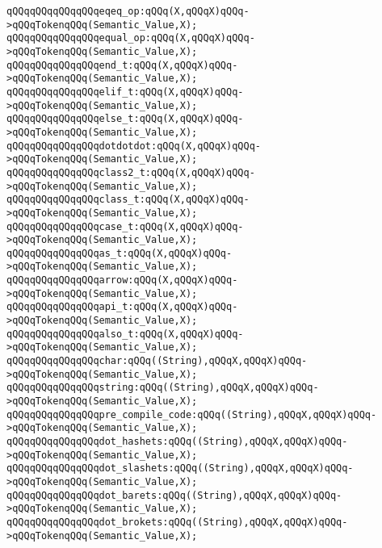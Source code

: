 \verb|qQQqqQQqqQQqqQQqeqeq_op:qQQq(X,qQQqX)qQQq->qQQqTokenqQQq(Semantic_Value,X);|\newline
\verb|qQQqqQQqqQQqqQQqequal_op:qQQq(X,qQQqX)qQQq->qQQqTokenqQQq(Semantic_Value,X);|\newline
\verb|qQQqqQQqqQQqqQQqend_t:qQQq(X,qQQqX)qQQq->qQQqTokenqQQq(Semantic_Value,X);|\newline
\verb|qQQqqQQqqQQqqQQqelif_t:qQQq(X,qQQqX)qQQq->qQQqTokenqQQq(Semantic_Value,X);|\newline
\verb|qQQqqQQqqQQqqQQqelse_t:qQQq(X,qQQqX)qQQq->qQQqTokenqQQq(Semantic_Value,X);|\newline
\verb|qQQqqQQqqQQqqQQqdotdotdot:qQQq(X,qQQqX)qQQq->qQQqTokenqQQq(Semantic_Value,X);|\newline
\verb|qQQqqQQqqQQqqQQqclass2_t:qQQq(X,qQQqX)qQQq->qQQqTokenqQQq(Semantic_Value,X);|\newline
\verb|qQQqqQQqqQQqqQQqclass_t:qQQq(X,qQQqX)qQQq->qQQqTokenqQQq(Semantic_Value,X);|\newline
\verb|qQQqqQQqqQQqqQQqcase_t:qQQq(X,qQQqX)qQQq->qQQqTokenqQQq(Semantic_Value,X);|\newline
\verb|qQQqqQQqqQQqqQQqas_t:qQQq(X,qQQqX)qQQq->qQQqTokenqQQq(Semantic_Value,X);|\newline
\verb|qQQqqQQqqQQqqQQqarrow:qQQq(X,qQQqX)qQQq->qQQqTokenqQQq(Semantic_Value,X);|\newline
\verb|qQQqqQQqqQQqqQQqapi_t:qQQq(X,qQQqX)qQQq->qQQqTokenqQQq(Semantic_Value,X);|\newline
\verb|qQQqqQQqqQQqqQQqalso_t:qQQq(X,qQQqX)qQQq->qQQqTokenqQQq(Semantic_Value,X);|\newline
\verb|qQQqqQQqqQQqqQQqchar:qQQq((String),qQQqX,qQQqX)qQQq->qQQqTokenqQQq(Semantic_Value,X);|\newline
\verb|qQQqqQQqqQQqqQQqstring:qQQq((String),qQQqX,qQQqX)qQQq->qQQqTokenqQQq(Semantic_Value,X);|\newline
\verb|qQQqqQQqqQQqqQQqpre_compile_code:qQQq((String),qQQqX,qQQqX)qQQq->qQQqTokenqQQq(Semantic_Value,X);|\newline
\verb|qQQqqQQqqQQqqQQqdot_hashets:qQQq((String),qQQqX,qQQqX)qQQq->qQQqTokenqQQq(Semantic_Value,X);|\newline
\verb|qQQqqQQqqQQqqQQqdot_slashets:qQQq((String),qQQqX,qQQqX)qQQq->qQQqTokenqQQq(Semantic_Value,X);|\newline
\verb|qQQqqQQqqQQqqQQqdot_barets:qQQq((String),qQQqX,qQQqX)qQQq->qQQqTokenqQQq(Semantic_Value,X);|\newline
\verb|qQQqqQQqqQQqqQQqdot_brokets:qQQq((String),qQQqX,qQQqX)qQQq->qQQqTokenqQQq(Semantic_Value,X);|\newline
